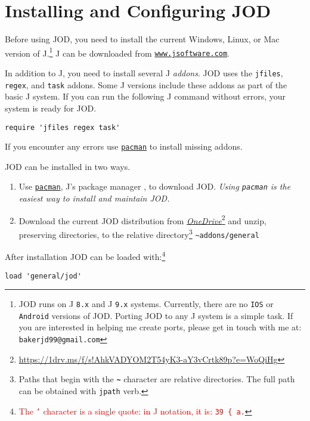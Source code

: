 \section{Installing and Configuring JOD}\label{ss:jodcfgdesc}

Before using JOD, you need to install the current Windows, Linux, or Mac version of J.\footnote{JOD runs on 
 J \texttt{8.x} and J \texttt{9.x} systems. Currently, there are no \texttt{IOS} or \texttt{Android} versions of JOD. Porting JOD 
to any J system is a simple task.
If you are interested in helping me create ports, please get in touch with me at:  
\texttt{bakerjd99@gmail.com}
} J can be downloaded from \href{https://www.jsoftware.com}{\texttt{www.jsoftware.com}}.

In addition to J, you need to install several J \emph{addons}. JOD uses the
\texttt{jfiles}, \texttt{regex}, and \texttt{task} addons.  Some J versions
include these addons as part of the basic J system. If you can run the following J command
without errors, your system is ready for JOD. 
\begin{lstlisting}[frame=single,framerule=0pt,label=lst:reqaddons]
   require 'jfiles regex task'
\end{lstlisting}
If you encounter any errors  use \href{https://code.jsoftware.com/wiki/Pacman}{\texttt{pacman}} to install 
missing addons.
 
JOD can be installed in two ways.  
\begin{enumerate}
	\item Use \href{https://code.jsoftware.com/wiki/Pacman}{\texttt{pacman}}, J's package manager 
	\cite{jwiki:pacman}, to download JOD. \emph{Using \texttt{pacman} is the easiest way to install and maintain JOD.}
	\item Download the current JOD distribution from \href{https://1drv.ms/f/s!AhkVADYOM2T54yK3-aY3vCrtk89p?e=WoQiHg}{\emph{OneDrive}}\footnote{\href{https://1drv.ms/f/s!AhkVADYOM2T54yK3-aY3vCrtk89p?e=WoQiHg}{https://1drv.ms/f/s!AhkVADYOM2T54yK3-aY3vCrtk89p?e=WoQiHg}} and unzip, preserving directories, to the relative directory\footnote{Paths that begin with the \textbf{\texttt{\~}} character are relative directories. The full path can be obtained with \texttt{jpath} verb. } \verb|~addons/general|
\end{enumerate}

After installation JOD can be loaded with:\footnote{\textcolor{red}{The \texttt{'} character 
is a single quote: in J notation, it is: \texttt{39 \{ a.}}
}
\begin{lstlisting}[frame=single,framerule=0pt,label=lst:loadjod00]
   load 'general/jod'
\end{lstlisting}

